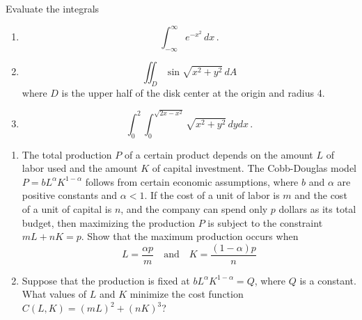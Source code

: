 \documentclass[12pt]{amsart}
\begin{document}
\newpage

\begin{problem}
Evaluate the integrals
\begin{enumerate}
	\item \begin{equation*}
		      \int_{-\infty}^\infty e^{-x^2} \, dx \,.
	      \end{equation*}
	      \vspace{8cm}

	\item \begin{equation*}
		      \iint_D \sin\sqrt{x^2 + y^2} \, dA
	      \end{equation*}
	      where $D$ is the upper half of the disk center at the origin and radius 4.
	      \vspace{8cm}

	\item \begin{equation*}
		      \int_0^2 \int_0^{\sqrt{2x - x^2}} \sqrt{x^2 + y^2} \, dy dx \,.
	      \end{equation*}
\end{enumerate}
\end{problem}
\newpage

\begin{problem}
\begin{enumerate}
	\item
	      The total production $P$ of a certain product depends on the amount $L$ of labor used and the amount $K$ of capital investment.
	      The Cobb-Douglas model $P = bL^{\alpha}K^{1-\alpha}$ follows from certain economic assumptions, where $b$ and $\alpha$ are positive constants and $\alpha < 1$. If the cost of a unit of labor is $m$ and the cost of a unit of capital is $n$, and the company can spend only $p$ dollars as its total budget, then maximizing the production $P$ is subject to the constraint $mL + nK = p$. Show that the maximum production occurs when
	      \[
		      L = \frac{\alpha p}{m} \quad \text{and} \quad K = \frac{(1 - \alpha)p}{n}
	      \]
	      \newpage

	\item Suppose that the production is fixed at $bL^{\alpha}K^{1-\alpha} = Q$, where $Q$ is a constant. What values of $L$ and $K$ minimize the cost function $C(L, K) = (mL)^2 + (nK)^3$?
\end{enumerate}
\end{problem}









\printbibliography
%
%
\end{document}
